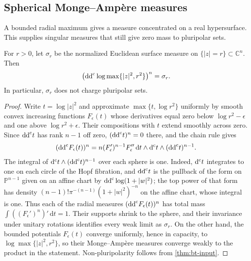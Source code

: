 \subsection{Spherical Monge--Amp\`ere measures}
\label{subsec:psh-spherical-measures}

A bounded radial maximum gives a measure concentrated on a real hypersurface. This supplies singular measures that still give zero mass to pluripolar sets.

\begin{lemma}\label{lem:spherical-bounded-product}
For $r>0$, let $\sigma_r$ be the normalized Euclidean surface measure on $\{|z|=r\}\subset\mathbb C^n$. Then
\[
 \bigl(\mathrm{dd}^{\mathrm{c}}\log\max\{|z|^2,r^2\}\bigr)^n=\sigma_r.
\]
In particular, $\sigma_r$ does not charge pluripolar sets.
\end{lemma}
\begin{proof}
Write $t=\log|z|^2$ and approximate $\max\{t,\log r^2\}$ uniformly by smooth convex increasing functions $F_\epsilon(t)$ whose derivatives equal zero below $\log r^2-\epsilon$ and one above $\log r^2+\epsilon$. Their compositions with $t$ extend smoothly across zero. Since $\mathrm{dd}^{\mathrm{c}} t$ has rank $n-1$ off zero, $(\mathrm{dd}^{\mathrm{c}} t)^n=0$ there, and the chain rule gives
\[
 (\mathrm{dd}^{\mathrm{c}} F_\epsilon(t))^n
 =n(F_\epsilon')^{n-1}F_\epsilon''\,\mathrm dt\wedge\mathrm d^{\mathrm c} t
                                      \wedge(\mathrm{dd}^{\mathrm{c}} t)^{n-1}.
\]
The integral of $\mathrm d^{\mathrm c} t\wedge(\mathrm{dd}^{\mathrm{c}} t)^{n-1}$ over each sphere is one. Indeed, $\mathrm d^{\mathrm c} t$ integrates to one on each circle of the Hopf fibration, and $\mathrm{dd}^{\mathrm{c}} t$ is the pullback of the form on $\mathbb P^{n-1}$ given on an affine chart by $\mathrm{dd}^{\mathrm{c}}\log(1+|w|^2)$; the top power of that form has density $(n-1)!\pi^{-(n-1)}(1+|w|^2)^{-n}$ on the affine chart, whose integral is one. Thus each of the radial measures $(\mathrm{dd}^{\mathrm{c}} F_\epsilon(t))^n$ has total mass $\int((F_\epsilon')^n)'\,\mathrm dt=1$. Their supports shrink to the sphere, and their invariance under unitary rotations identifies every weak limit as $\sigma_r$. On the other hand, the bounded potentials $F_\epsilon(t)$ converge uniformly, hence in capacity, to $\log\max\{|z|^2,r^2\}$, so their Monge--Amp\`ere measures converge weakly to the product in the statement. Non-pluripolarity follows from \cref{thm:bt-input}.
\end{proof}
